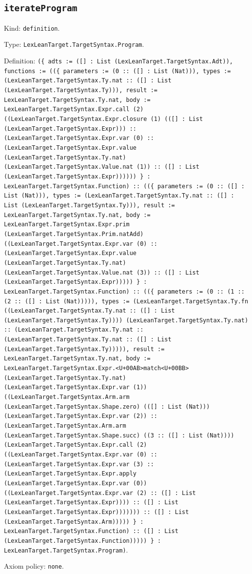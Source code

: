 \documentclass[11pt]{article}
\begin{document}
\subsection*{\texttt{iterateProgram}}
\noindent Kind: \texttt{definition}.\par
\noindent Type: \texttt{LexLeanTarget.TargetSyntax.Program}.\par
\noindent Definition: \texttt{(\{ adts := ([] : List (LexLeanTarget.TargetSyntax.Adt)), functions := ((\{ parameters := (0 :: ([] : List (Nat))), types := (LexLeanTarget.TargetSyntax.Ty.nat :: ([] : List (LexLeanTarget.TargetSyntax.Ty))), result := LexLeanTarget.TargetSyntax.Ty.nat, body := LexLeanTarget.TargetSyntax.Expr.call (2) ((LexLeanTarget.TargetSyntax.Expr.closure (1) (([] : List (LexLeanTarget.TargetSyntax.Expr))) :: (LexLeanTarget.TargetSyntax.Expr.var (0) :: (LexLeanTarget.TargetSyntax.Expr.value (LexLeanTarget.TargetSyntax.Ty.nat) (LexLeanTarget.TargetSyntax.Value.nat (1)) :: ([] : List (LexLeanTarget.TargetSyntax.Expr)))))) \} : LexLeanTarget.TargetSyntax.Function) :: ((\{ parameters := (0 :: ([] : List (Nat))), types := (LexLeanTarget.TargetSyntax.Ty.nat :: ([] : List (LexLeanTarget.TargetSyntax.Ty))), result := LexLeanTarget.TargetSyntax.Ty.nat, body := LexLeanTarget.TargetSyntax.Expr.prim (LexLeanTarget.TargetSyntax.Prim.natAdd) ((LexLeanTarget.TargetSyntax.Expr.var (0) :: (LexLeanTarget.TargetSyntax.Expr.value (LexLeanTarget.TargetSyntax.Ty.nat) (LexLeanTarget.TargetSyntax.Value.nat (3)) :: ([] : List (LexLeanTarget.TargetSyntax.Expr))))) \} : LexLeanTarget.TargetSyntax.Function) :: ((\{ parameters := (0 :: (1 :: (2 :: ([] : List (Nat))))), types := (LexLeanTarget.TargetSyntax.Ty.fn ((LexLeanTarget.TargetSyntax.Ty.nat :: ([] : List (LexLeanTarget.TargetSyntax.Ty)))) (LexLeanTarget.TargetSyntax.Ty.nat) :: (LexLeanTarget.TargetSyntax.Ty.nat :: (LexLeanTarget.TargetSyntax.Ty.nat :: ([] : List (LexLeanTarget.TargetSyntax.Ty))))), result := LexLeanTarget.TargetSyntax.Ty.nat, body := LexLeanTarget.TargetSyntax.Expr.<U+00AB>match<U+00BB> (LexLeanTarget.TargetSyntax.Ty.nat) (LexLeanTarget.TargetSyntax.Expr.var (1)) ((LexLeanTarget.TargetSyntax.Arm.arm (LexLeanTarget.TargetSyntax.Shape.zero) (([] : List (Nat))) (LexLeanTarget.TargetSyntax.Expr.var (2)) :: (LexLeanTarget.TargetSyntax.Arm.arm (LexLeanTarget.TargetSyntax.Shape.succ) ((3 :: ([] : List (Nat)))) (LexLeanTarget.TargetSyntax.Expr.call (2) ((LexLeanTarget.TargetSyntax.Expr.var (0) :: (LexLeanTarget.TargetSyntax.Expr.var (3) :: (LexLeanTarget.TargetSyntax.Expr.apply (LexLeanTarget.TargetSyntax.Expr.var (0)) ((LexLeanTarget.TargetSyntax.Expr.var (2) :: ([] : List (LexLeanTarget.TargetSyntax.Expr)))) :: ([] : List (LexLeanTarget.TargetSyntax.Expr))))))) :: ([] : List (LexLeanTarget.TargetSyntax.Arm))))) \} : LexLeanTarget.TargetSyntax.Function) :: ([] : List (LexLeanTarget.TargetSyntax.Function))))) \} : LexLeanTarget.TargetSyntax.Program)}.\par
\noindent Axiom policy: \texttt{none}.\par
\end{document}
